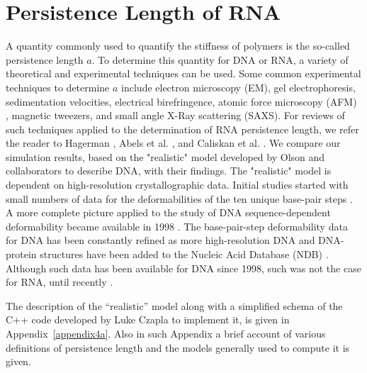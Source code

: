 \section{Persistence Length of RNA}
A quantity commonly used to  quantify the stiffness of polymers is the
so-called persistence  length $a$. To determine this  quantity for DNA
or RNA,  a variety of  theoretical and experimental techniques  can be
used.  Some  common experimental  techniques to determine  $a$ include
electron   microscopy   (EM),   gel   electrophoresis,   sedimentation
velocities, electrical birefringence,  atomic force microscopy (AFM) ,
magnetic  tweezers,  and small  angle  X-Ray  scattering (SAXS).   For
reviews  of  such  techniques  applied  to the  determination  of  RNA
persistence    length,    we   refer    the    reader   to    Hagerman
\cite{hagerman1997}, Abels  et al.  \cite{abels2005},  and Caliskan et
al.   \cite{caliskan2005}.  We  compare  our  simulation results,
based on  the "realistic" model  developed by Olson  and collaborators
\cite{olson1995} to describe DNA, with their findings. The "realistic"
model is dependent  on high-resolution crystallographic data.  Initial
studies started with small numbers  of data for the deformabilities of
the  ten unique  base-pair  steps \cite{olson1995}.   A more  complete
picture applied  to the study of DNA  sequence-dependent deformability
became  available   in  1998  \cite{olson1998}.    The  base-pair-step
deformability  data  for  DNA  has  been constantly  refined  as  more
high-resolution DNA and DNA-protein  structures have been added to the
Nucleic Acid Database (NDB) \cite{balasubramanian2009}.  Although such
data has been available for DNA  since 1998, such was not the case for
RNA, until recently \cite{olson2009}.

The  description of the  ``realistic'' model  along with  a simplified
schema of  the C++ code  developed by Luke  Czapla to implement  it, is
given  in Appendix~\ref{appendix4a}.  Also  in such  Appendix a  brief
account of  various definitions of  persistence length and  the models
generally used to compute it is given.

